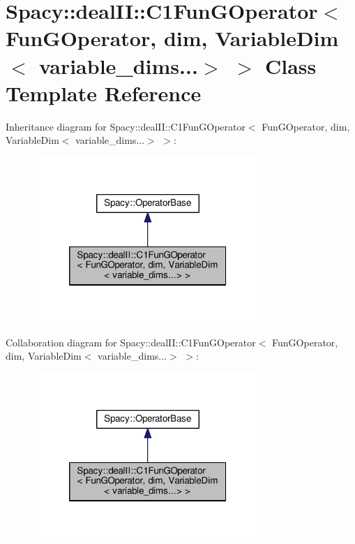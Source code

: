 \hypertarget{classSpacy_1_1dealII_1_1C1FunGOperator_3_01FunGOperator_00_01dim_00_01VariableDim_3_01variable__dims_8_8_8_4_01_4}{\section{Spacy\-:\-:deal\-I\-I\-:\-:C1\-Fun\-G\-Operator$<$ Fun\-G\-Operator, dim, Variable\-Dim$<$ variable\-\_\-dims...$>$ $>$ Class Template Reference}
\label{classSpacy_1_1dealII_1_1C1FunGOperator_3_01FunGOperator_00_01dim_00_01VariableDim_3_01variable__dims_8_8_8_4_01_4}
}


Inheritance diagram for Spacy\-:\-:deal\-I\-I\-:\-:C1\-Fun\-G\-Operator$<$ Fun\-G\-Operator, dim, Variable\-Dim$<$ variable\-\_\-dims...$>$ $>$\-:
\nopagebreak
\begin{figure}[H]
\begin{center}
\leavevmode
\includegraphics[width=246pt]{classSpacy_1_1dealII_1_1C1FunGOperator_3_01FunGOperator_00_01dim_00_01VariableDim_3_01variable__6cd9ff2446aa850f90d8e6b072b74f9a}
\end{center}
\end{figure}


Collaboration diagram for Spacy\-:\-:deal\-I\-I\-:\-:C1\-Fun\-G\-Operator$<$ Fun\-G\-Operator, dim, Variable\-Dim$<$ variable\-\_\-dims...$>$ $>$\-:
\nopagebreak
\begin{figure}[H]
\begin{center}
\leavevmode
\includegraphics[width=246pt]{classSpacy_1_1dealII_1_1C1FunGOperator_3_01FunGOperator_00_01dim_00_01VariableDim_3_01variable__dims_8_8_8_4_01_4__coll__graph}
\end{center}
\end{figure}
